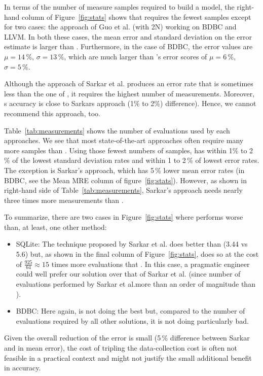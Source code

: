 In terms of the number of measure samples required to build a model, the right-hand column of Figure~\ref{fig:stats} shows that \what requires the fewest samples except for two cases: the approach of Guo et al. (with 2N) working on BDBC and LLVM. In both these cases, the mean error and standard deviation on the error estimate is larger than \what. Furthermore, in the case of BDBC, the error values
 are $\mu=14\,\%$, $\sigma=13\,\%$, which are much larger
than \what{}'s error scores of $\mu=6\,\%$, $\sigma=5\,\%$. 

Although the approach of Sarkar et al. produces an error rate that is sometimes less than the one of \what, it requires the highest number of measurements. Moreover, \what\textquotesingle s   accuracy is close to Sarkar\textquotesingle s approach (1\% to 2\%) difference). Hence, we cannot recommend this approach, too.

Table~\ref{tab:measurements} shows the number of evaluations used by each approaches. We see that most state-of-the-art approaches often require many more samples than
\what{}.  Using those fewest numbers of samples, \what has
within 1\% to 2\,\% of the lowest standard deviation rates 
and within 1 to 2\,\% of lowest error rates.
The exception is Sarkar's approach, which has 5\,\% lower mean error
rates (in BDBC, see the Mean MRE column of figure~\ref{fig:stats}).  However, 
as shown in right-hand side of Table~\ref{tab:measurements}, Sarkar's approach needs nearly three times
more measurements than \what. 

\noindent To summarize, there are two cases in Figure~\ref{fig:stats} where \what performs worse than, at least, one
other method:
\begin{itemize}
\item 
SQLite: The technique proposed by Sarkar et al. does better than \what (3.44 vs 5.6)
but, as shown in the final column of Figure~\ref{fig:stats},
does so at the cost of $\frac{925}{64} \approx 15$ times more evaluations that \what.
In this case, a pragmatic engineer could well prefer our solution over that of Sarkar et al. (since
number of evaluations performed by Sarkar et al.more than an order of magnitude than \what).
\item BDBC: Here again, \what is not doing the best but, compared to the number of evaluations required by all other solutions, it  is not doing particularly bad.
\end{itemize}


\noindent Given
the overall reduction of the error is   small (5\,\% difference
between Sarkar and \what in mean error), the 
cost of tripling the data-collection cost is
often not feasible in a practical context and might not justify the small additional benefit in accuracy. 

